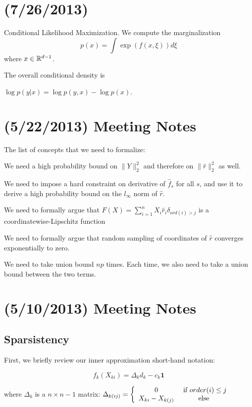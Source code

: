 \documentclass{article}
\begin{document}
\section{(7/26/2013)}

Conditional Likelihood Maximization. We compute the marginalization
$$
p(x) = \int \exp(f(x, \xi)) d \xi
$$
where $x \in \mathbb{R}^{d-1}$.

The overall conditional density is

$\log p(y|x) = \log p(y,x) - \log p(x)$. 



\section{(5/22/2013) Meeting Notes}

The list of concepts that we need to formalize:
\begin{packed_enum}
\item We need a high probability bound on $\|Y\|_2^2$ and therefore on $\| \hat{r} \|_2^2$ as well.
\item We need to impose a hard constraint on derivative of $\hat{f}_s$ for all $s$, and use it to derive a high probability bound on the $l_\infty$ norm of $\hat{r}$.
\item We need to formally argue that $F(X) = \sum_{i=1}^n X_i \hat{r}_i \delta_{ ord(i) > j}$ is a coordinatewise-Lipschitz function
\item We need to formally argue that random sampling of coordinates of $\hat{r}$ converges exponentially to zero.
\item We need to take union bound $np$ times. Each time, we also need to take a union bound between the two terms.
\end{packed_enum}


\section{(5/10/2013) Meeting Notes}

\subsection{Sparsistency}

First, we briefly review our inner approximation short-hand notation:

\[f_k(X_{ki}) = \Delta_k d_k  - c_k \mathbf{1}\]

where $\Delta_k$ is a $n\times n-1$ matrix: $\Delta_{k (ij)} = \left\{ \begin{array}{cc} 0 & \textrm{ if } order(i) \leq j \\ X_{ki} - X_{k(j)} & \textrm{ else } \end{array} \right.$
\end{document}
